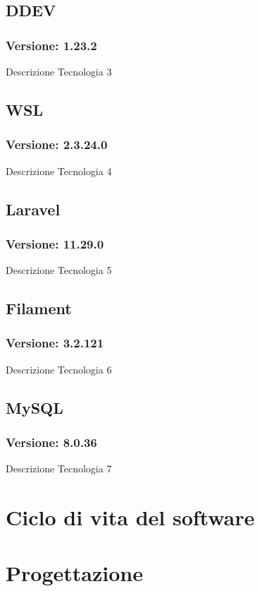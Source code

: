 \subsection{DDEV}
\subsubsection{Versione: 1.23.2}
Descrizione Tecnologia 3

\subsection{WSL}
\subsubsection{Versione: 2.3.24.0}
Descrizione Tecnologia 4

\subsection{\label{tec:Laravel}Laravel}
\subsubsection{Versione: 11.29.0}
Descrizione Tecnologia 5

\subsection{\label{tec:Filament}Filament}
\subsubsection{Versione: 3.2.121}
Descrizione Tecnologia 6

\subsection{MySQL}
\subsubsection{Versione: 8.0.36}
Descrizione Tecnologia 7

\section{Ciclo di vita del software}
\label{sec:ciclo-vita-software}

\section{Progettazione}
\label{sec:progettazione}

